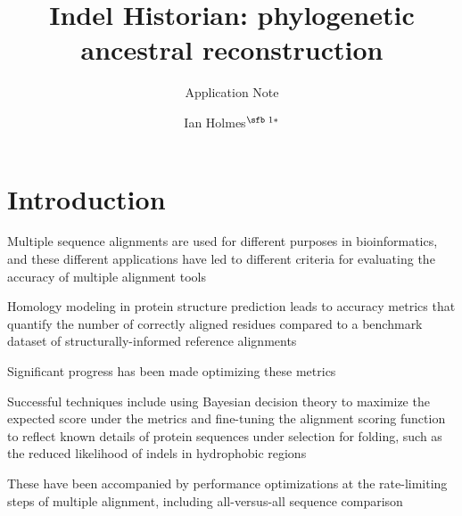 \documentclass{bioinfo}
\begin{document}

\subtitle{Application Note}

\title[Indel Historian: phylogenetic ancestral reconstruction]{Indel Historian: phylogenetic ancestral reconstruction}
\author[Ian Holmes]{Ian Holmes$^{\text{\sfb 1}*}$}
\address{$^{\text{\sf 1}}$Department of Bioengineering, University of California, Berkeley, 94703, USA.}





\maketitle

\section{Introduction}

Multiple sequence alignments are used for different purposes in bioinformatics,
and these different applications have led to different criteria for evaluating
the accuracy of multiple alignment tools

Homology modeling in protein structure prediction
leads to accuracy metrics that quantify the number of correctly aligned residues
compared to a benchmark dataset of structurally-informed reference alignments

Significant progress has been made optimizing these metrics

Successful techniques include using Bayesian decision theory to maximize the expected
score under the metrics \cite{TCOFFEE,ProbCons,AMAP,FSA}
and fine-tuning the alignment scoring function to reflect known details of
protein sequences under selection for folding, such as the reduced likelihood of indels in
hydrophobic regions \cite{MAFFT,MUSCLE}

These have been accompanied by performance optimizations at the rate-limiting steps
of multiple alignment, including all-versus-all sequence comparison \cite{FSA,MUSCLE}
\end{document}
